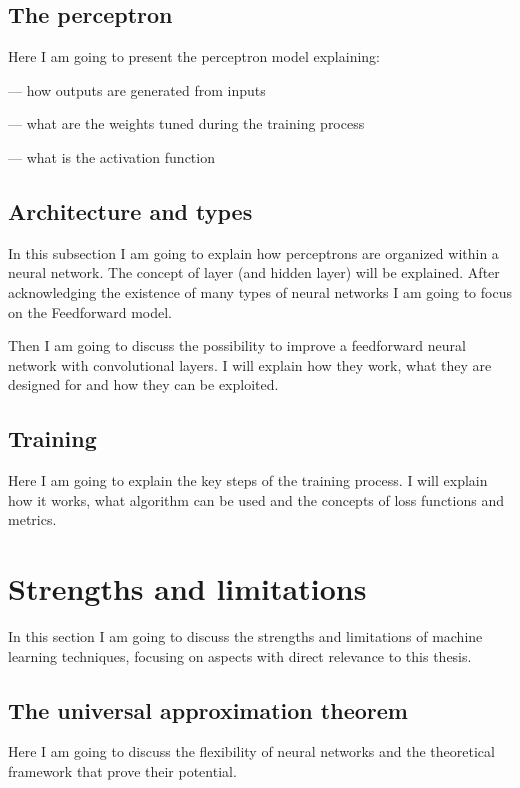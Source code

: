 \documentclass[a4paper,10pt]{report}
\begin{document}
\subsection{The perceptron}

Here I am going to present the perceptron model explaining:

— how outputs are generated from inputs

— what are the weights tuned during the training process

— what is the activation function

\subsection{Architecture and types}

In this subsection I am going to explain how perceptrons are organized 
within a neural network. The concept of layer (and hidden layer) will be explained.
After acknowledging the existence of many types of neural networks
I am going to focus on the Feedforward model.

Then I am going to discuss the possibility to improve a 
feedforward neural network with convolutional layers.
I will explain how they work, what they are designed for and how they can be exploited.

\subsection{Training}

Here I am going to explain the key steps of the training process.
I will explain how it works, what algorithm can be used and the concepts
of loss functions and metrics.

\section{Strengths and limitations}

In this section I am going to discuss the strengths and limitations 
of machine learning techniques, focusing on aspects with direct relevance
to this thesis.

\subsection{The universal approximation theorem}

Here I am going to discuss the flexibility of neural networks and the
theoretical framework that prove their potential.
\end{document}
